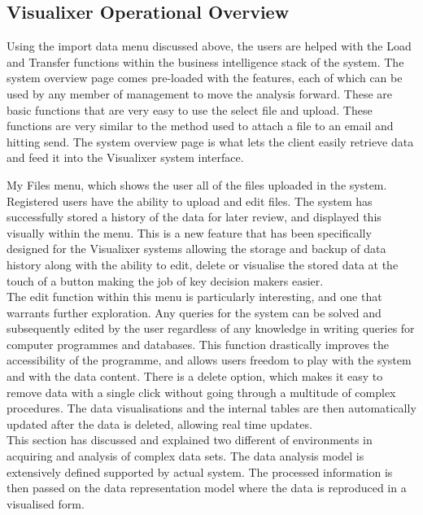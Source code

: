 \subsection{Visualixer Operational Overview}

Using the import data menu discussed above, the users are helped with the Load and Transfer functions within the business intelligence stack of the system. The system overview page comes pre-loaded with the features, each of which can be used by any member of management to move the analysis forward. These are basic functions that are very easy to use the select file and upload. These functions are very similar to the method used to attach a file to an email and hitting send. The system overview page is what lets the client easily retrieve data and feed it into the Visualixer system interface.

My Files menu, which shows the user all of the files uploaded in the system. Registered users have the ability to upload and edit files.  The system has successfully stored a history of the data for later review, and displayed this visually within the menu. This is a new feature that has been specifically designed for the Visualixer systems allowing the storage and backup of data history along with the ability to edit, delete or visualise the stored data at the touch of a button making the job of key decision makers easier.\\

The edit function within this menu is particularly interesting, and one that warrants further exploration. Any queries for the system can be solved and subsequently edited by the user regardless of any knowledge in writing queries for computer programmes and databases. This function drastically improves the accessibility of the programme, and allows users freedom to play with the system and with the data content. There is a delete option, which makes it easy to remove data with a single click without going through a multitude of complex procedures. The data visualisations and the internal tables are then automatically updated after the data is deleted, allowing real time updates.\\

This section has discussed and explained two different of environments in acquiring and analysis of complex data sets. The data analysis model is extensively defined supported by actual system. The processed information is then passed on the data representation model where the data is reproduced in a visualised form. 

